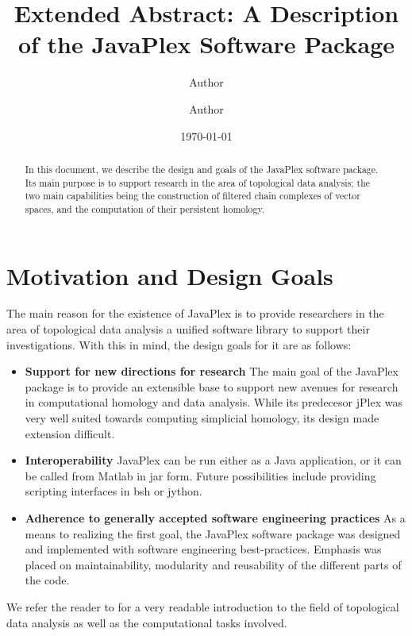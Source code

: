 \documentclass[10pt]{article}
\title{Extended Abstract: A Description of the JavaPlex Software Package}
\author[1,*]{Author}
\author[2]{Author}
\affil[1]{Affiliation}
\affil[2]{Affiliation}
\date{\today}
\begin{document}
\maketitle

\let\oldthefootnote\thefootnote
\renewcommand{\thefootnote}{\fnsymbol{footnote}}
\let\thefootnote\oldthefootnote

\begin{abstract}
In this document, we describe the design and goals of the JavaPlex software package. Its main purpose is to support research in the area of topological data analysis; the two main capabilities being the construction of filtered chain complexes of vector spaces, and the computation of their persistent homology.
\end{abstract}

\section{Motivation and Design Goals}

The main reason for the existence of JavaPlex is to provide researchers in the area of topological data analysis a unified software library to support their investigations. With this in mind, the design goals for it are as follows:

\begin{itemize}
\item {\bf Support for new directions for research} The main goal of the JavaPlex package is to provide an extensible base to support new avenues for research in computational homology and data analysis. While its predecesor jPlex was very well suited towards computing simplicial homology, its design made extension difficult.
\item {\bf Interoperability} JavaPlex can be run either as a Java application, or it can be called from Matlab in jar form. Future possibilities include providing scripting interfaces in bsh or jython.
\item {\bf Adherence to generally accepted software engineering practices} As a means to realizing the first goal, the JavaPlex software package was designed and implemented with software engineering best-practices. Emphasis was placed on maintainability, modularity and reusability of the different parts of the code.
\end{itemize}

We refer the reader to \cite{Carlsson_09} for a very readable introduction to the field of topological data analysis as well as the computational tasks involved.
\end{document}
